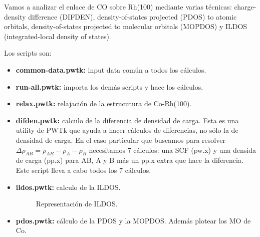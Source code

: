   Vamos a analizar el enlace de CO sobre Rh(100) mediante varias técnicas: charge-density difference (DIFDEN), density-of-states projected (PDOS) to atomic orbitals, density-of-states projected to molecular orbitals (MOPDOS) y ILDOS (integrated-local density of states).

  Los scripts son:
    \begin{itemize}
      \item \textbf{common-data.pwtk:} input data común a todos los cálculos.
      \item \textbf{run-all.pwtk:} importa los demás scripts y hace los cálculos.
      \item \textbf{relax.pwtk:} relajación de la estrucutura de Co-Rh(100).
      \item \textbf{difden.pwtk:} calculo de la diferencia de densidad de carga. Esta es una utility de PWTk que ayuda a hacer cálculos de diferencias, no sólo la de densidad de carga. En el caso particular que buscamos para resolver $\Delta\rho_{AB} = \rho_{AB} - \rho_A - \rho_B$ necesitamos 7 cálculos: una SCF (pw.x) y una densida de carga (pp.x) para AB, A y B más un pp.x extra que hace la diferencia. Este script lleva a cabo todos los 7 cálculos.
      \item \textbf{ildos.pwtk:} calculo de la ILDOS.
      \begin{figure}[H]
          \centering
          \caption{Representación de ILDOS.}
      \end{figure}
      \item \textbf{pdos.pwtk:} cálculo de la PDOS y la MOPDOS. Además plotear los MO de Co.
    \end{itemize}

